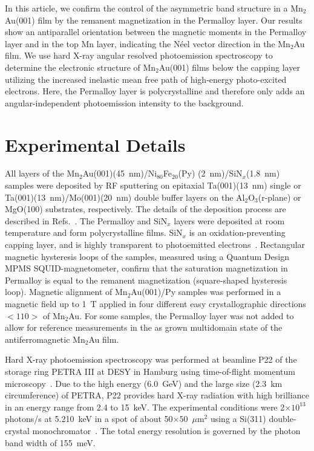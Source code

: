 \documentclass[aps,prb,twocolumn,superscriptaddress,10pt]{revtex4-1}
\begin{document}
In this article, 
we confirm the control of the asymmetric band structure in a Mn$_2$Au(001) film by the remanent magnetization in the Permalloy layer. 
Our results show an antiparallel orientation between the magnetic moments
in the Permalloy layer and 
in the top Mn layer, indicating the  N{\'e}el vector direction in the Mn$_2$Au film.
We use hard X-ray angular resolved photoemission spectroscopy
to determine the electronic structure of Mn$_2$Au(001) films below the
capping layer utilizing the increased inelastic mean free path of high-energy photo-excited electrons. 
Here, the Permalloy layer is polycrystalline and therefore only adds an angular-independent photoemission intensity to the background.


\section{Experimental Details}
All layers of the Mn$_2$Au(001)(45~nm)/Ni$_{80}$Fe$_{20}$(Py)
(2~nm)/SiN$_x$(1.8~nm) samples were deposited by RF sputtering on epitaxial Ta(001)(13~nm) single or Ta(001)(13~nm)/Mo(001)(20~nm) double buffer layers on the Al$_2$O$_3$(r-plane) or MgO(100) substrates, respectively. The details of the deposition process are described in Refs.~. The Permalloy and SiN$_x$ layers were deposited at room temperature and form polycrystalline films. SiN$_x$ is an oxidation-preventing capping layer, and is highly transparent to photoemitted electrons~\cite{Elmers2020}.
Rectangular magnetic hysteresis loops of the samples, measured using a Quantum
Design MPMS SQUID-magnetometer, confirm that the saturation magnetization 
in Permalloy is equal to the remanent magnetization (square-shaped hysteresis loop). Magnetic alignment of Mn$_2$Au(001)/Py samples was performed in a magnetic field 
up to 1~T applied in four different easy crystallographic directions 
$<110>$ of Mn$_2$Au.
For some samples, the Permalloy layer was not added 
to allow for reference measurements in the as grown
multidomain state of the antiferromagnetic Mn$_2$Au film.

Hard X-ray photoemission spectroscopy was performed at beamline P22
of the storage ring PETRA III at DESY in Hamburg
 using time-of-flight momentum microscopy~\cite{Medjanik2017}. 
Due to the high energy (6.0~GeV) and the
large size (2.3~km circumference) of PETRA, P22 provides
hard X-ray radiation with high brilliance
in an energy range from 2.4 to 15~keV. 
The experimental conditions were 2$\times 10^{13}$ photons/s at 5.210~keV in a spot of about
50$\times 50$~$\mu$m$^2$ using a Si(311) double-crystal monochromator~\cite{Medjanik2019}. 
The total energy resolution is
governed by the photon band width of 155~meV.
\end{document}
